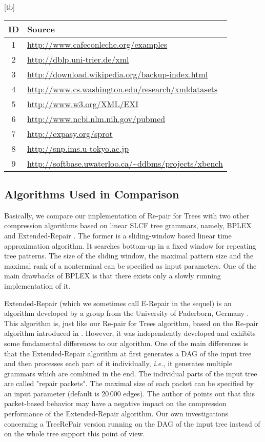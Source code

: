 \documentclass[12pt]{llncs}
\makeatletter
\renewenvironment{table}
               {\setlength\abovecaptionskip{10\p@}\setlength\belowcaptionskip{10\p@}\@float{table}}
               {\end@float}
\newcommand{\trp}{\mbox{TreeRePair}\xspace}
\newcommand{\hairsp}{\hspace{1pt}}\newcommand{\TODO}{\textcolor{red}{\bf TODO!}\xspace}
\newcommand{\ie}{\mbox{\textit{i.\hairsp{}e.}}\xspace}
\makeatother
\begin{document}
\begin{table}[tb]
	\footnotesize\centering
	\begin{tabular}{cl}
		\toprule
		ID&Source\\
		\midrule
		1&\url{http://www.cafeconleche.org/examples}\\
		2&\url{http://dblp.uni-trier.de/xml}\\
		3&\url{http://download.wikipedia.org/backup-index.html}\\
		4&\url{http://www.cs.washington.edu/research/xmldatasets}\\
		5&\url{http://www.w3.org/XML/EXI}\\
		6&\url{http://www.ncbi.nlm.nih.gov/pubmed}\\
		7&\url{http://expasy.org/sprot}\\
		8&\url{http://snp.ims.u-tokyo.ac.jp}\\
		9&\url{http://softbase.uwaterloo.ca/~ddbms/projects/xbench}\\
		\bottomrule
	\end{tabular}
	\caption{Sources of the XML documents from Table \ref{tbl:characteristicsXmlDocuments}.}
	\label{tbl:sourcesOfXmlDocuments}
\end{table}

\subsection{Algorithms Used in Comparison}

Basically, we compare our implementation of Re-pair for Trees with two
other compression algorithms based on linear SLCF tree grammars,
namely, BPLEX \cite{Busatto08efficient} and Extended-Repair
\cite{Krislin08repair,Boettcher10clustering}. The former is a
sliding-window based linear time approximation algorithm. It searches
bottom-up in a fixed window for repeating tree patterns. The size of
the sliding window, the maximal pattern size and the maximal rank of a
nonterminal can be specified as input parameters. 
One of the main drawbacks of BPLEX is that there exists only a slowly running implementation of it.

Extended-Repair (which we sometimes call E-Repair in the
sequel) is an algorithm developed by a group from 
the University of Paderborn, Germany 
\cite{Krislin08repair,Boettcher10clustering}. This algorithm is, just
like our Re-pair for Trees algorithm, based on the Re-pair algorithm
introduced in \cite{larsson2000off}. However, it was independently
developed and exhibits some fundamental differences to our
algorithm. One of the main differences is that the Extended-Repair
algorithm at first generates a DAG of the input tree and then
processes each part of it individually, \ie, it generates multiple
grammars which are combined in the end. The individual parts of the
input tree are called "repair packets". The maximal size of each
packet can be specified by an input parameter (default is 20\,000
edges). The author of \cite{Krislin08repair} points out that this
packet-based behavior may have a negative impact on the compression
performance of the Extended-Repair algorithm. Our own investigations
concerning a \trp version running on the DAG of the input tree instead 
of on the whole tree support this point of view. 
\end{document}
